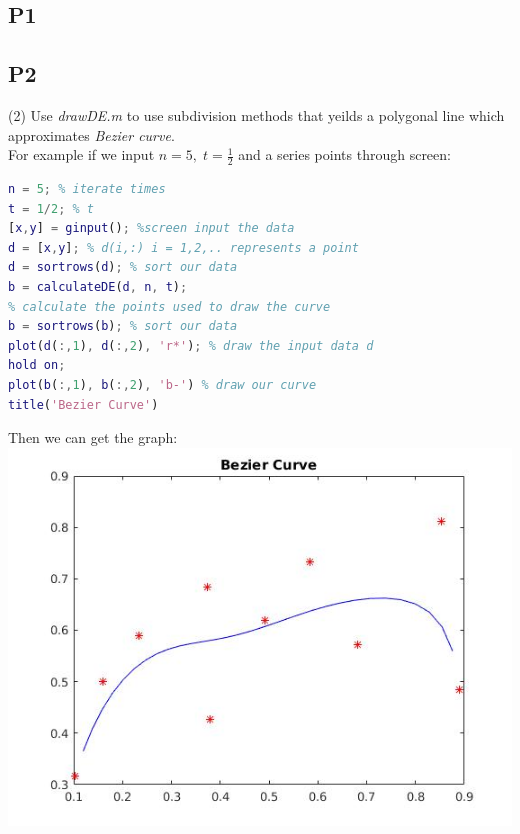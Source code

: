 \documentclass[12pt]{article}
\begin{document}
\subsection*{P1}
\subsection*{P2}
(2)
Use \textit{drawDE.m} to use subdivision methods that yeilds a polygonal line which approximates \textit{Bezier curve}. \\
For example if we input $n = 5 , \; t = \frac{1}{2}$ and a series points through screen: 
\begin{lstlisting}[language=Matlab]
n = 5; % iterate times 
t = 1/2; % t 
[x,y] = ginput(); %screen input the data 
d = [x,y]; % d(i,:) i = 1,2,.. represents a point 
d = sortrows(d); % sort our data 
b = calculateDE(d, n, t); 
% calculate the points used to draw the curve 
b = sortrows(b); % sort our data 
plot(d(:,1), d(:,2), 'r*'); % draw the input data d
hold on;
plot(b(:,1), b(:,2), 'b-') % draw our curve 
title('Bezier Curve')
\end{lstlisting}
Then we can get the graph: \\
\includegraphics[scale=.5]{npoints}
\end{document}
